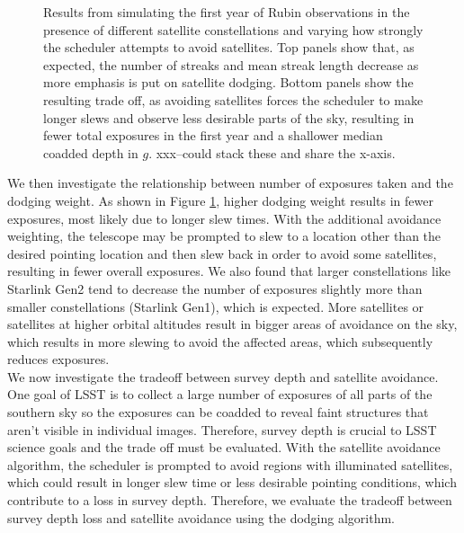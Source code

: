 \documentclass[linenumbers]{aastex631}
\begin{document}
\begin{figure}[ht!]
\caption{Results from simulating the first year of Rubin observations in the presence of different satellite constellations and varying how strongly the scheduler attempts to avoid satellites.  Top panels show that, as expected, the number of streaks and mean streak length decrease as more emphasis is put on satellite dodging. Bottom panels show the resulting trade off, as avoiding satellites forces the scheduler to make longer slews and observe less desirable parts of the sky, resulting in fewer total exposures in the first year and a shallower median coadded depth in $g$.
xxx--could stack these and share the x-axis. 
\label{fig-pixel-loss-weight}}
\end{figure}

We then investigate the relationship between number of exposures taken and the dodging weight. As shown in Figure \ref{fig-pixel-loss-weight}, higher dodging weight results in fewer exposures, most likely due to longer slew times. With the additional avoidance weighting, the telescope may be prompted to slew to a location other than the desired pointing location and then slew back in order to avoid some satellites, resulting in fewer overall exposures. We also found that larger constellations like Starlink Gen2 tend to decrease the number of exposures slightly more than smaller constellations (Starlink Gen1), which is expected. More satellites or satellites at higher orbital altitudes result in bigger areas of avoidance on the sky, which results in more slewing to avoid the affected areas, which subsequently reduces exposures. \\

We now investigate the tradeoff between survey depth and satellite avoidance. One goal of LSST is to collect a large number of exposures of all parts of the southern sky so the exposures can be coadded to reveal faint structures that aren’t visible in individual images. Therefore, survey depth is crucial to LSST science goals and the trade off must be evaluated. With the satellite avoidance algorithm, the scheduler is prompted to avoid regions with illuminated satellites, which could result in longer slew time or less desirable pointing conditions, which contribute to a loss in survey depth. Therefore, we evaluate the tradeoff between survey depth loss and satellite avoidance using the dodging algorithm.\\
\end{document}
